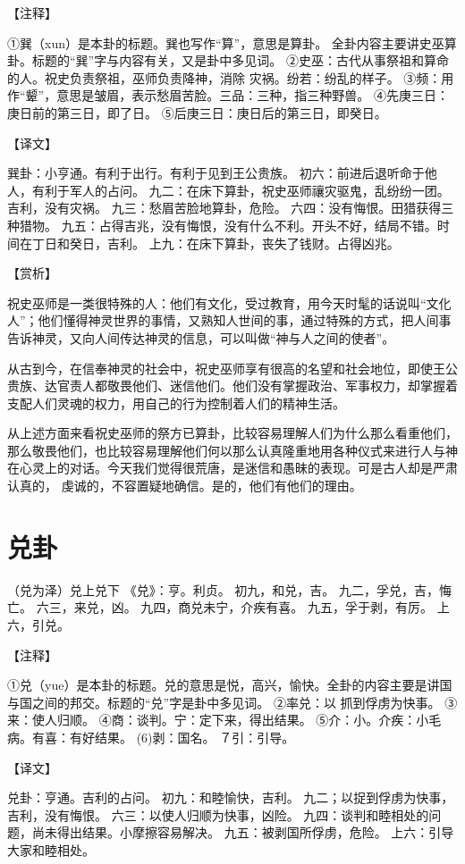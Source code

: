 \documentclass[12pt,UTF8]{ctexbook}
\begin{document}
【注释】

①巽（xun）是本卦的标题。巽也写作“算”，意思是算卦。 全卦内容主要讲史巫算卦。标题的“巽”字与内容有关，又是卦中多见词。
②史巫：古代从事祭祖和算命的人。祝史负责祭祖，巫师负责降神，消除 灾祸。纷若：纷乱的样子。
③频：用作“颦”，意思是皱眉，表示愁眉苦脸。三品：三种，指三种野兽。
④先庚三日：庚日前的第三日，即了日。
⑤后庚三日：庚日后的第三日，即癸日。

【译文】

巽卦：小亨通。有利于出行。有利于见到王公贵族。
初六：前进后退听命于他人，有利于军人的占问。
九二：在床下算卦，祝史巫师禳灾驱鬼，乱纷纷一团。吉利，没有灾祸。
九三：愁眉苦脸地算卦，危险。
六四：没有悔恨。田猎获得三种猎物。
九五：占得吉兆，没有悔恨，没有什么不利。开头不好，结局不错。时间在丁日和癸日，吉利。
上九：在床下算卦，丧失了钱财。占得凶兆。

【赏析】

祝史巫师是一类很特殊的人：他们有文化，受过教育，用今天时髦的话说叫“文化人”；他们懂得神灵世界的事情，又熟知人世间的事，通过特殊的方式，把人间事告诉神灵，又向人间传达神灵的信息，可以叫做“神与人之间的使者”。

从古到今，在信奉神灵的社会中，祝史巫师享有很高的名望和社会地位，即使王公贵族、达官责人都敬畏他们、迷信他们。他们没有掌握政治、军事权力，却掌握着支配人们灵魂的权力，用自己的行为控制着人们的精神生活。

从上述方面来看祝史巫师的祭方已算卦，比较容易理解人们为什么那么看重他们，那么敬畏他们，也比较容易理解他们何以那么认真隆重地用各种仪式来进行人与神在心灵上的对话。今天我们觉得很荒唐，是迷信和愚昧的表现。可是古人却是严肃认真的， 虔诚的，不容置疑地确信。是的，他们有他们的理由。

\chapter{兑卦}

（兑为泽）兑上兑下
《兑》：亨。利贞。
初九，和兑，吉。
九二，孚兑，吉，悔亡。
六三，来兑，凶。
九四，商兑未宁，介疾有喜。
九五，孚于剥，有厉。
上六，引兑。

【注释】

①兑（yue）是本卦的标题。兑的意思是悦，高兴，愉快。全卦的内容主要是讲国与国之间的邦交。标题的“兑”字是卦中多见词。
②率兑：以 抓到俘虏为快事。
③来：使人归顺。
④商：谈判。宁：定下来，得出结果。
⑤介：小。介疾：小毛病。有喜：有好结果。
(6)剥：国名。
７引：引导。

【译文】

兑卦：亨通。吉利的占问。
初九：和睦愉快，吉利。
九二；以捉到俘虏为快事，吉利，没有悔恨。
六三：以使人归顺为快事，凶险。
九四：谈判和睦相处的问题，尚未得出结果。小摩擦容易解决。
九五：被剥国所俘虏，危险。
上六：引导大家和睦相处。
\end{document}
